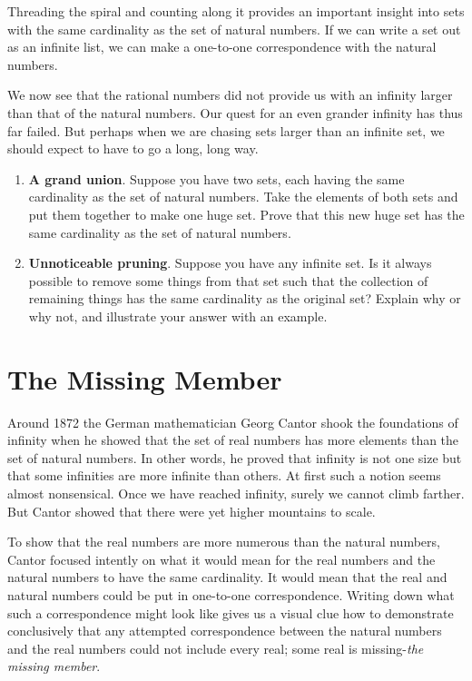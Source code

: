 Threading the spiral and counting along it provides an important insight into sets with the same cardinality as the set of natural numbers. If we can write a set out as an infinite list, we can make a one-to-one correspondence with the natural numbers.

We now see that the rational numbers did not provide us with an infinity larger than that of the natural numbers. Our quest for an even grander infinity has thus far failed. But perhaps when we are chasing sets larger than an infinite set, we should expect to have to go a long, long way.

\begin{enumerate}
	\item \textbf{A grand union}. Suppose you have two sets, each having the same
cardinality as the set of natural numbers. Take the elements of both
sets and put them together to make one huge set. Prove that this
new huge set has the same cardinality as the set of natural numbers. \vfill
\item \textbf{ Unnoticeable pruning}. Suppose you have any infinite set. Is it
always possible to remove some things from that set such that the
collection of remaining things has the same cardinality as the original
set? Explain why or why not, and illustrate your answer with an
example.\vfill
\end{enumerate}

\clearpage
\section{The Missing Member} \solnsfalse

Around 1872 the German mathematician Georg Cantor shook the foundations of infinity when he showed that the set of real numbers has more elements than the set of natural numbers. In other words, he proved that infinity is not one size but that some infinities are more infinite than others. At first such a notion seems almost nonsensical. Once we have reached infinity, surely we cannot climb farther. But Cantor showed that there were yet higher mountains to scale.

To show that the real numbers are more numerous than the natural numbers, Cantor focused intently on what it would mean for the real numbers and the natural numbers to have the same cardinality. It would mean that the real and natural numbers could be put in one-to-one correspondence. Writing down what such a correspondence might look like gives us a visual clue how to demonstrate conclusively that any attempted correspondence between the natural numbers and the real numbers could not include every real; some real is missing-\emph{the missing member}.


